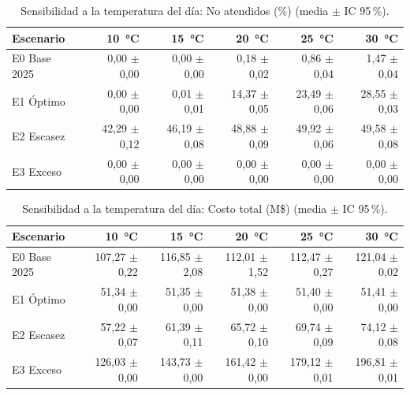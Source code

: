 \documentclass[11pt,a4paper]{article}
\begin{document}
\begin{table}[H]
\centering
\small
\begin{tabular}{lrrrrr}
\toprule
\textbf{Escenario} & \textbf{10 \,°C} & \textbf{15 \,°C} & \textbf{20 \,°C} & \textbf{25 \,°C} & \textbf{30 \,°C} \\
\midrule
E0 Base 2025 & 0,00 $\pm$ 0,00 & 0,00 $\pm$ 0,00 & 0,18 $\pm$ 0,02 & 0,86 $\pm$ 0,04 & 1,47 $\pm$ 0,04 \\
E1 Óptimo & 0,00 $\pm$ 0,00 & 0,01 $\pm$ 0,01 & 14,37 $\pm$ 0,05 & 23,49 $\pm$ 0,06 & 28,55 $\pm$ 0,03 \\
E2 Escasez & 42,29 $\pm$ 0,12 & 46,19 $\pm$ 0,08 & 48,88 $\pm$ 0,09 & 49,92 $\pm$ 0,06 & 49,58 $\pm$ 0,08 \\
E3 Exceso & 0,00 $\pm$ 0,00 & 0,00 $\pm$ 0,00 & 0,00 $\pm$ 0,00 & 0,00 $\pm$ 0,00 & 0,00 $\pm$ 0,00 \\
\bottomrule
\end{tabular}
\caption{Sensibilidad a la temperatura del día: No atendidos (\%) (media $\pm$ IC 95\,\%).}
\label{tab:sens-noatendidos}
\end{table}

\begin{table}[H]
\centering
\small
\begin{tabular}{lrrrrr}
\toprule
\textbf{Escenario} & \textbf{10 \,°C} & \textbf{15 \,°C} & \textbf{20 \,°C} & \textbf{25 \,°C} & \textbf{30 \,°C} \\
\midrule
E0 Base 2025 & 107,27 $\pm$ 0,22 & 116,85 $\pm$ 2,08 & 112,01 $\pm$ 1,52 & 112,47 $\pm$ 0,27 & 121,04 $\pm$ 0,02 \\
E1 Óptimo & 51,34 $\pm$ 0,00 & 51,35 $\pm$ 0,00 & 51,38 $\pm$ 0,00 & 51,40 $\pm$ 0,00 & 51,41 $\pm$ 0,00 \\
E2 Escasez & 57,22 $\pm$ 0,07 & 61,39 $\pm$ 0,11 & 65,72 $\pm$ 0,10 & 69,74 $\pm$ 0,09 & 74,12 $\pm$ 0,08 \\
E3 Exceso & 126,03 $\pm$ 0,00 & 143,73 $\pm$ 0,00 & 161,42 $\pm$ 0,00 & 179,12 $\pm$ 0,01 & 196,81 $\pm$ 0,01 \\
\bottomrule
\end{tabular}
\caption{Sensibilidad a la temperatura del día: Costo total (M\$) (media $\pm$ IC 95\,\%).}
\label{tab:sens-costototalm}
\end{table}
\end{document}
